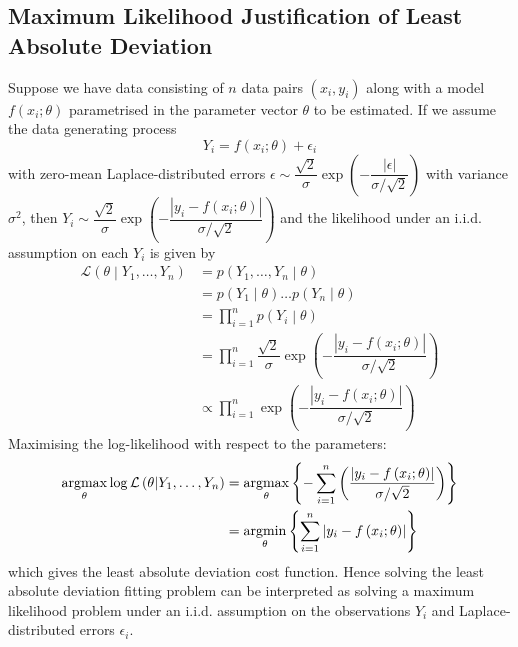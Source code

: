 \documentclass[11pt]{report} %
\begin{document}
\subsection{Maximum Likelihood Justification of Least Absolute Deviation}

Suppose we have data consisting of $n$ data pairs $\left(x_{i}, y_{i}\right)$ along with a model $f\left(x_{i}; \theta\right)$ parametrised in the parameter vector $\theta$ to be estimated. If we assume the data generating process
\begin{equation}
Y_{i} = f\left(x_{i}; \theta\right) + \epsilon_{i}
\end{equation}
with zero-mean Laplace-distributed errors $\epsilon \sim \dfrac{\sqrt{2}}{\sigma}\exp\left(-\dfrac{\left|\epsilon\right|}{\sigma/\sqrt{2}}\right)$ with variance $\sigma^{2}$, then $Y_{i} \sim \dfrac{\sqrt{2}}{\sigma}\exp\left(-\dfrac{\left|y_{i} - f\left(x_{i}; \theta\right)\right|}{\sigma/\sqrt{2}}\right)$ and the likelihood under an i.i.d. assumption on each $Y_{i}$ is given by
\begin{align}
\mathcal{L}\left(\theta\middle|Y_{1}, \dots, Y_{n}\right) &= p\left(Y_{1}, \dots, Y_{n}\middle|\theta\right) \\
&= p\left(Y_{1}\middle|\theta\right)\dots p\left(Y_{n}\middle|\theta\right) \\
&= \prod_{i = 1}^{n}p\left(Y_{i}\middle|\theta\right) \\
&= \prod_{i = 1}^{n}\dfrac{\sqrt{2}}{\sigma}\exp\left(-\dfrac{\left|y_{i} - f\left(x_{i}; \theta\right)\right|}{\sigma/\sqrt{2}}\right) \\
&\propto \prod_{i = 1}^{n}\exp\left(-\dfrac{\left|y_{i} - f\left(x_{i}; \theta\right)\right|}{\sigma/\sqrt{2}}\right)
\end{align}
Maximising the log-likelihood with respect to the parameters:
\begin{align}
\operatorname*{argmax}_{\theta}\log\mathcal{L}\left(\theta\middle|Y_{1}, \dots, Y_{n}\right) &= \operatorname*{argmax}_{\theta}\left\{-\sum_{i = 1}^{n}\left(\dfrac{\left|y_{i} - f\left(x_{i}; \theta\right)\right|}{\sigma/\sqrt{2}}\right)\right\} \\
&= \operatorname*{argmin}_{\theta}\left\{\sum_{i = 1}^{n}\left|y_{i} - f\left(x_{i}; \theta\right)\right|\right\}
\end{align}
which gives the least absolute deviation cost function. Hence solving the least absolute deviation fitting problem can be interpreted as solving a maximum likelihood problem under an i.i.d. assumption on the observations $Y_{i}$ and Laplace-distributed errors $\epsilon_{i}$.
\end{document}
